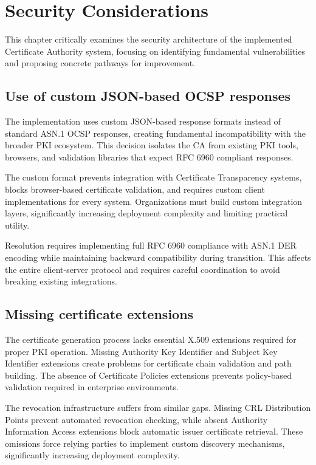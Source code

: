 \chapter{Security Considerations}

This chapter critically examines the security architecture of the implemented Certificate Authority system, focusing on identifying fundamental vulnerabilities and proposing concrete pathways for improvement.


\section{Use of custom JSON-based OCSP responses}

The implementation uses custom JSON-based response formats instead of standard ASN.1 OCSP responses, creating fundamental incompatibility with the broader PKI ecosystem. This decision isolates the CA from existing PKI tools, browsers, and validation libraries that expect RFC 6960 compliant responses.

The custom format prevents integration with Certificate Transparency systems, blocks browser-based certificate validation, and requires custom client implementations for every system. Organizations must build custom integration layers, significantly increasing deployment complexity and limiting practical utility.

Resolution requires implementing full RFC 6960 compliance with ASN.1 DER encoding while maintaining backward compatibility during transition. This affects the entire client-server protocol and requires careful coordination to avoid breaking existing integrations.

\section{Missing certificate extensions}

The certificate generation process lacks essential X.509 extensions required for proper PKI operation. Missing Authority Key Identifier and Subject Key Identifier extensions create problems for certificate chain validation and path building. The absence of Certificate Policies extensions prevents policy-based validation required in enterprise environments.

The revocation infrastructure suffers from similar gaps. Missing CRL Distribution Points prevent automated revocation checking, while absent Authority Information Access extensions block automatic issuer certificate retrieval. These omissions force relying parties to implement custom discovery mechanisms, significantly increasing deployment complexity.

